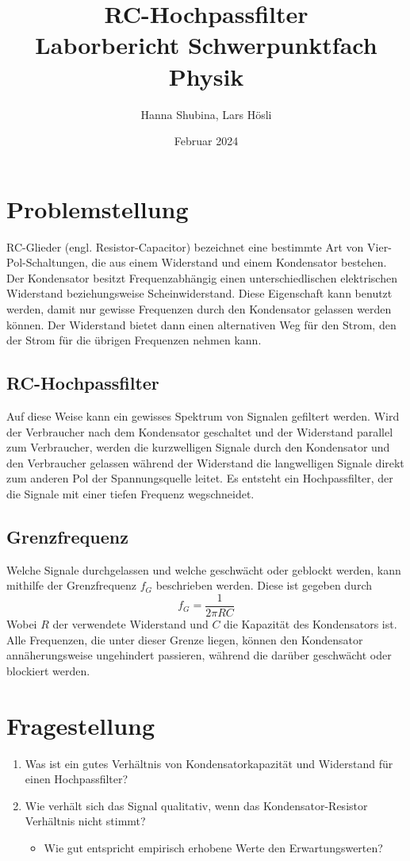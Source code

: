 \documentclass{article}
\title{
    RC-Hochpassfilter \\
    Laborbericht Schwerpunktfach Physik
}
\author{Hanna Shubina, Lars Hösli}
\date{Februar 2024}
\begin{document}
\maketitle

\section{Problemstellung}

RC-Glieder (engl. Resistor-Capacitor) bezeichnet eine bestimmte Art von Vier-Pol-Schaltungen, die aus einem Widerstand und einem Kondensator bestehen. Der Kondensator besitzt Frequenzabhängig einen unterschiedlischen elektrischen Widerstand beziehungsweise Scheinwiderstand. Diese Eigenschaft kann benutzt werden, damit nur gewisse Frequenzen durch den Kondensator gelassen werden können. Der Widerstand bietet dann einen alternativen Weg für den Strom, den der Strom für die übrigen Frequenzen nehmen kann.

\subsection{RC-Hochpassfilter}
Auf diese Weise kann ein gewisses Spektrum von Signalen gefiltert werden. Wird der Verbraucher nach dem Kondensator geschaltet und der Widerstand parallel zum Verbraucher, werden die kurzwelligen Signale durch den Kondensator und den Verbraucher gelassen während der Widerstand die langwelligen Signale direkt zum anderen Pol der Spannungsquelle leitet.
Es entsteht ein Hochpassfilter, der die Signale mit einer tiefen Frequenz wegschneidet.

\subsection{Grenzfrequenz}
Welche Signale durchgelassen und welche geschwächt oder geblockt werden, kann mithilfe der Grenzfrequenz $f_G$ beschrieben werden. Diese ist gegeben durch
\[
    f_G = \frac{1}{2\pi RC}
\]
Wobei $R$ der verwendete Widerstand und $C$ die Kapazität des Kondensators ist. Alle Frequenzen, die unter dieser Grenze liegen, können den Kondensator annäherungsweise ungehindert passieren, während die darüber geschwächt oder blockiert werden.


\section{Fragestellung}
\begin{enumerate}
    \item Was ist ein gutes Verhältnis von Kondensatorkapazität und Widerstand für einen Hochpassfilter?
    \item Wie verhält sich das Signal qualitativ, wenn das Kondensator-Resistor Verhältnis nicht stimmt?
    \begin{itemize}
        \item Wie gut entspricht empirisch erhobene Werte den Erwartungswerten?
    \end{itemize}
\end{enumerate}
\end{document}
